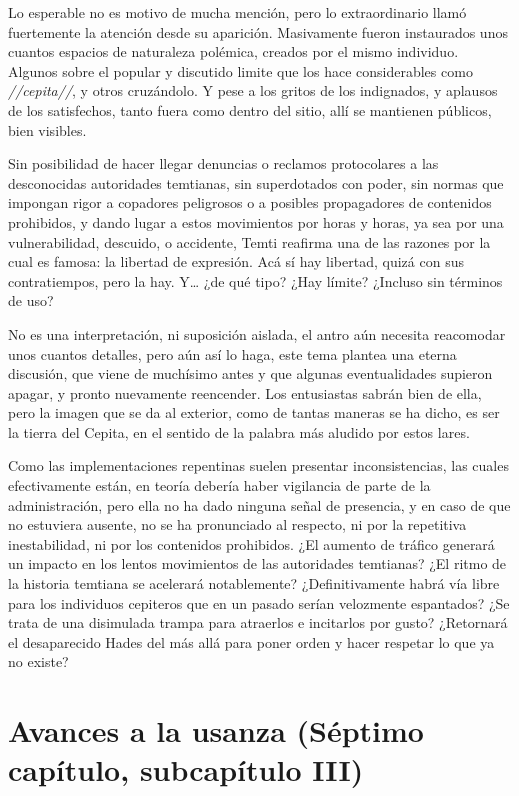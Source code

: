 \documentclass[
  spanish,
]{book}
\begin{document}
Lo esperable no es motivo de mucha mención, pero lo extraordinario llamó fuertemente la atención desde su aparición. Masivamente fueron instaurados unos cuantos espacios de naturaleza polémica, creados por el mismo individuo. Algunos sobre el popular y discutido limite que los hace considerables como \emph{//cepita//}, y otros cruzándolo. Y pese a los gritos de los indignados, y aplausos de los satisfechos, tanto fuera como dentro del sitio, allí se mantienen públicos, bien visibles.

Sin posibilidad de hacer llegar denuncias o reclamos protocolares a las desconocidas autoridades temtianas, sin superdotados con poder, sin normas que impongan rigor a copadores peligrosos o a posibles propagadores de contenidos prohibidos, y dando lugar a estos movimientos por horas y horas, ya sea por una vulnerabilidad, descuido, o accidente, Temti reafirma una de las razones por la cual es famosa: la libertad de expresión. Acá sí hay libertad, quizá con sus contratiempos, pero la hay. Y\ldots{} ¿de qué tipo? ¿Hay límite? ¿Incluso sin términos de uso?

No es una interpretación, ni suposición aislada, el antro aún necesita reacomodar unos cuantos detalles, pero aún así lo haga, este tema plantea una eterna discusión, que viene de muchísimo antes y que algunas eventualidades supieron apagar, y pronto nuevamente reencender. Los entusiastas sabrán bien de ella, pero la imagen que se da al exterior, como de tantas maneras se ha dicho, es ser la tierra del Cepita, en el sentido de la palabra más aludido por estos lares.

Como las implementaciones repentinas suelen presentar inconsistencias, las cuales efectivamente están, en teoría debería haber vigilancia de parte de la administración, pero ella no ha dado ninguna señal de presencia, y en caso de que no estuviera ausente, no se ha pronunciado al respecto, ni por la repetitiva inestabilidad, ni por los contenidos prohibidos. ¿El aumento de tráfico generará un impacto en los lentos movimientos de las autoridades temtianas? ¿El ritmo de la historia temtiana se acelerará notablemente? ¿Definitivamente habrá vía libre para los individuos cepiteros que en un pasado serían velozmente espantados? ¿Se trata de una disimulada trampa para atraerlos e incitarlos por gusto? ¿Retornará el desaparecido Hades del más allá para poner orden y hacer respetar lo que ya no existe?

\hypertarget{avances-a-la-usanza-suxe9ptimo-capuxedtulo-subcapuxedtulo-iii}{%
\section{Avances a la usanza (Séptimo capítulo, subcapítulo III)}\label{avances-a-la-usanza-suxe9ptimo-capuxedtulo-subcapuxedtulo-iii}}
\end{document}
